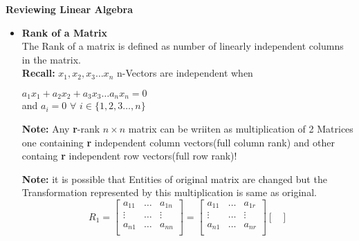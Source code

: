 \documentclass[a4paper]{article}
\numberwithin{equation}{section}
\begin{document}
\begin{center}
    \textbf{\Huge{Reviewing Linear Algebra}}
\end{center}
\vspace{5pt}
\begin{itemize}
    \item \textbf{Rank of a Matrix}
                \vspace{5pt}\\
                The Rank of a matrix is defined as  number of linearly independent columns in the matrix.\\

        \textbf{Recall:} $x_1,x_2,x_3\dots x_n $ n-Vectors are independent when
        \begin{center}
            $a_1x_1+a_2x_2+a_3x_3\dots a_nx_n=0$\\
            \vspace{3pt}
            and $a_i=0 $ $\forall$  $i \in \{{1,2,3\dots ,n}\}$
        \end{center}
        \vspace{5pt}
        \textbf{Note:} Any \textbf{r}-rank $n\times n$ matrix can be wriiten as multiplication of 2 Matrices one containing \textbf{r} independent column vectors(full column rank) and other containg \textbf{r} independent row vectors(full row rank)!
        \begin{center}
        \end{center}
        \textbf{Note:} it is possible that Entities of original matrix are changed but the Transformation represented by this multiplication is same as original.
            \[R_1=
                \begin{bmatrix}
                    a_{11} & \dots & a_{1n}\\
                    \vdots & \dots & \vdots \\
                    a_{n1} & \dots & a_{nn}\\
                \end{bmatrix}=
                \begin{bmatrix}
                    a_{11} & \dots & a_{1r}\\
                    \vdots & \dots & \vdots \\
                    a_{n1} & \dots & a_{nr}\\
                \end{bmatrix}
                \begin{bmatrix}

\end{bmatrix}\]
\end{itemize}
\end{document}
